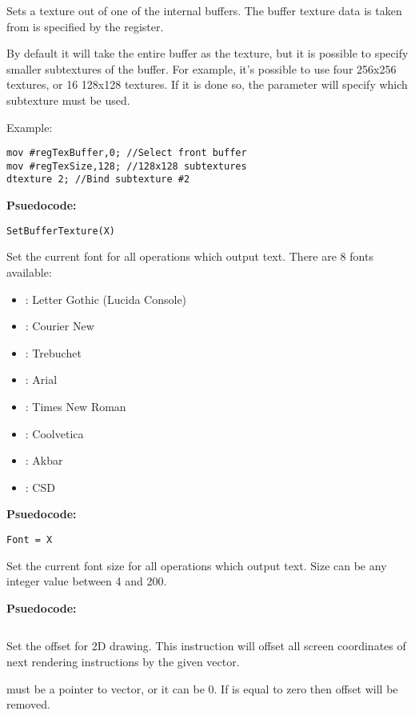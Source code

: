 Sets a texture out of one of the internal buffers. The buffer texture data is taken from is specified by the  register.

By default it will take the entire buffer as the texture, but it is possible to specify smaller subtextures of the buffer. For example, it's possible to use four 256x256 textures, or 16 128x128 textures. If it is done so, the  parameter will specify which subtexture must be used.

Example:
\begin{verbatim}
mov #regTexBuffer,0; //Select front buffer
mov #regTexSize,128; //128x128 subtextures
dtexture 2; //Bind subtexture #2
\end{verbatim}

\textbf{Psuedocode:}
\begin{verbatim}
SetBufferTexture(X)
\end{verbatim}


Set the current font for all operations which output text. There are 8 fonts available:
\begin{itemize}
	\item {}: Letter Gothic (Lucida Console)
	\item {}: Courier New
	\item {}: Trebuchet
	\item {}: Arial
	\item {}: Times New Roman
	\item {}: Coolvetica
	\item {}: Akbar
	\item {}: CSD
\end{itemize}
\textbf{Psuedocode:}
\begin{verbatim}
Font = X
\end{verbatim}


Set the current font size for all operations which output text. Size can be any integer value between 4 and 200.

\textbf{Psuedocode:}
\begin{verbatim}
\end{verbatim}


Set the offset for 2D drawing. This instruction will offset all screen coordinates of next rendering instructions by the given vector.

 must be a pointer to vector, or it can be 0. If  is equal to zero then offset will be removed.

